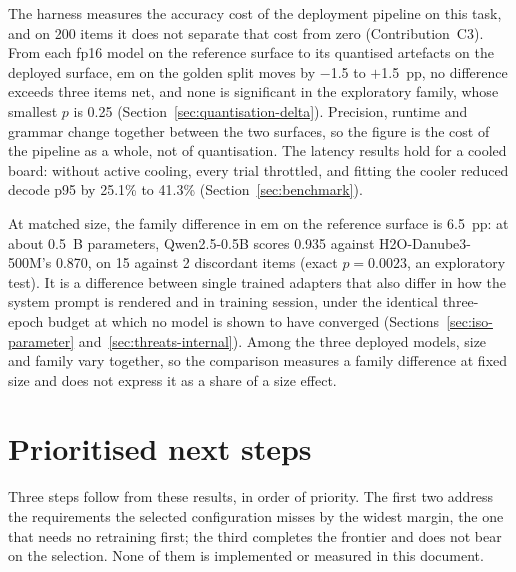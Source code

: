 The harness measures the accuracy cost of the deployment pipeline on this task, and on 200 items it
does not separate that cost from zero (Contribution~C3). From each fp16 model on the reference
surface to its quantised artefacts on the deployed surface, \gls{em} on the golden split moves by
$-$1.5 to $+$1.5~pp, no difference exceeds three items net, and none is significant in the
exploratory family, whose smallest $p$ is 0.25 (Section~\ref{sec:quantisation-delta}). Precision,
runtime and grammar change together between the two surfaces, so the figure is the cost of the
pipeline as a whole, not of quantisation. The latency results hold for a cooled board: without
active cooling, every trial throttled, and fitting the cooler reduced decode p95 by 25.1\% to
41.3\% (Section~\ref{sec:benchmark}).

At matched size, the family difference in \gls{em} on the reference surface is 6.5~pp: at about
0.5~B parameters, Qwen2.5-0.5B scores 0.935 against
H2O-Danube3-500M's 0.870, on 15 against 2 discordant items (exact
$p = 0.0023$, an exploratory test). It is a difference between single trained adapters that also
differ in how the system prompt is rendered and in training session, under the identical
three-epoch budget at which no model is shown to have converged (Sections~\ref{sec:iso-parameter}
and~\ref{sec:threats-internal}). Among the three deployed models, size
and family vary together, so the comparison measures a family difference at fixed size and does
not express it as a share of a size effect.

\clearpage
\section{Prioritised next steps}
\label{sec:next-steps}

Three steps follow from these results, in order of priority. The first two address the
requirements the selected configuration misses by the widest margin, the one that needs no
retraining first; the third completes the frontier and does not bear on the selection. None of
them is implemented or measured in this document.

